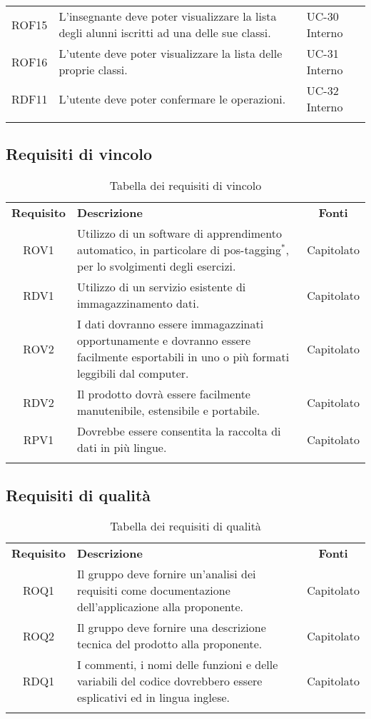 \begin{tabularx}{\textwidth}{| c | p{10cm} | X |}
		ROF15 & L'insegnante deve poter visualizzare la lista degli alunni iscritti ad una delle sue classi. & UC-30 \newline Interno\\
		ROF16 & L'utente deve poter visualizzare la lista delle proprie classi. & UC-31 \newline Interno\\
		RDF11 & L'utente deve poter confermare le operazioni. & UC-32 \newline Interno\\
		\hline
		\caption{Tabella dei requisiti funzionali}
\end{tabularx}

\subsection{Requisiti di vincolo}
\begin{longtable}{| c | p{10cm} | c |}
		\rowcolor{LightBlue}
		\color{white}\bfseries Requisito & \color{white}\bfseries Descrizione & \color{white}\bfseries Fonti\\[0.25cm]
		ROV1 & Utilizzo di un software di apprendimento automatico, in particolare di pos-tagging$^*$, per lo svolgimenti degli esercizi. & Capitolato \\
		RDV1 & Utilizzo di un servizio esistente di immagazzinamento dati. & Capitolato \\
		ROV2 & I dati dovranno essere immagazzinati opportunamente e dovranno essere facilmente esportabili in uno o più formati leggibili dal computer. & Capitolato \\
		RDV2 & Il prodotto dovrà essere facilmente manutenibile, estensibile e portabile. & Capitolato \\
		RPV1 & Dovrebbe essere consentita la raccolta di dati in più lingue. & Capitolato \\ \hline
		\caption{Tabella dei requisiti di vincolo}
\end{longtable}

\subsection{Requisiti di qualità}
\begin{longtable}{| c | p{10cm} | c |}
		\rowcolor{LightBlue}
		\color{white}\bfseries Requisito & \color{white}\bfseries Descrizione & \color{white}\bfseries Fonti\\[0.25cm]
		ROQ1 & Il gruppo deve fornire un'analisi dei requisiti come documentazione dell'applicazione alla proponente. & Capitolato \\
		ROQ2 & Il gruppo deve fornire una descrizione tecnica del prodotto alla proponente. & Capitolato \\ 
		RDQ1 & I commenti, i nomi delle funzioni e delle variabili del codice dovrebbero essere esplicativi ed in lingua inglese. & Capitolato \\ \hline
		\caption{Tabella dei requisiti di qualità}
\end{longtable}